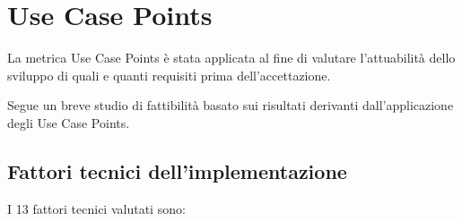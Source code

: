 \section{Use Case Points}

La metrica Use Case Points è stata applicata al fine di valutare l'attuabilità dello sviluppo di quali e quanti requisiti prima dell'accettazione.

Segue un breve studio di fattibilità basato sui risultati derivanti dall'applicazione degli Use Case Points.


\subsection{Fattori tecnici dell'implementazione}

I 13 fattori tecnici valutati sono:

